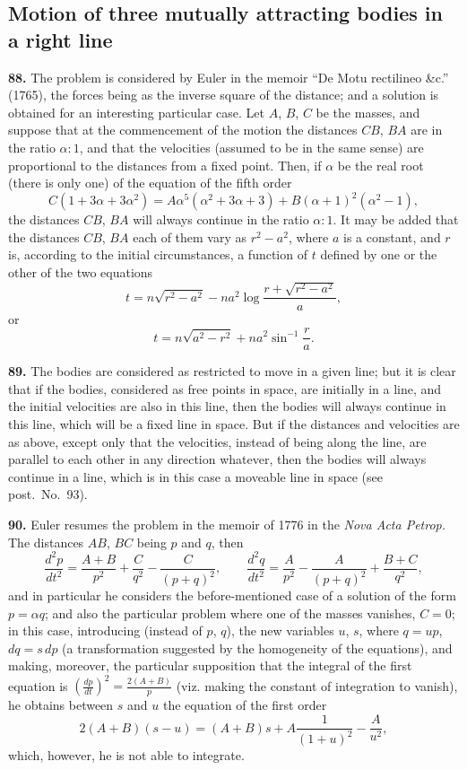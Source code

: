 \documentclass[11pt,a4paper]{book}
\begin{document}
\subsection*{Motion of three mutually attracting bodies in a right line}

\textbf{88.} The problem is considered by Euler in the memoir ``De Motu rectilineo \&c.'' (1765), the forces being as the inverse square of the distance; and a solution is obtained for an interesting particular case. Let $A$, $B$, $C$ be the masses, and suppose that at the commencement of the motion the distances $CB$, $BA$ are in the ratio $\alpha : 1$, and that the velocities (assumed to be in the same sense) are proportional to the distances from a fixed point. Then, if $\alpha$ be the real root (there is only one) of the equation of the fifth order
\[
C(1 + 3\alpha + 3\alpha^2) = A\alpha^5(\alpha^2 + 3\alpha + 3) + B(\alpha + 1)^2(\alpha^2 - 1),
\]
the distances $CB$, $BA$ will always continue in the ratio $\alpha : 1$. It may be added that the distances $CB$, $BA$ each of them vary as $r^2 - a^2$, where $a$ is a constant, and $r$ is, according to the initial circumstances, a function of $t$ defined by one or the other of the two equations
\[
t = n\sqrt{r^2 - a^2} - na^2\log\frac{r + \sqrt{r^2 - a^2}}{a},
\]
or
\[
t = n\sqrt{a^2 - r^2} + na^2\sin^{-1}\frac{r}{a}.
\]

\textbf{89.} The bodies are considered as restricted to move in a given line; but it is clear that if the bodies, considered as free points in space, are initially in a line, and the initial velocities are also in this line, then the bodies will always continue in this line, which will be a fixed line in space. But if the distances and velocities are as above, except only that the velocities, instead of being along the line, are parallel to each other in any direction whatever, then the bodies will always continue in a line, which is in this case a moveable line in space (see post.\ No.~93).

\textbf{90.} Euler resumes the problem in the memoir of 1776 in the \textit{Nova Acta Petrop.} The distances $AB$, $BC$ being $p$ and $q$, then
\[
\frac{d^2p}{dt^2} = \frac{A + B}{p^2} + \frac{C}{q^2} - \frac{C}{(p+q)^2}, \qquad
\frac{d^2q}{dt^2} = \frac{A}{p^2} - \frac{A}{(p+q)^2} + \frac{B + C}{q^2},
\]
and in particular he considers the before-mentioned case of a solution of the form $p = \alpha q$; and also the particular problem where one of the masses vanishes, $C = 0$; in this case, introducing (instead of $p$, $q$), the new variables $u$, $s$, where $q = up$, $dq = s\,dp$ (a transformation suggested by the homogeneity of the equations), and making, moreover, the particular supposition that the integral of the first equation is $\left(\frac{dp}{dt}\right)^2 = \frac{2(A+B)}{p}$ (viz. making the constant of integration to vanish), he obtains between $s$ and $u$ the equation of the first order
\[
2(A + B)(s - u) = (A + B)s + A\frac{1}{(1+u)^2} - \frac{A}{u^2},
\]
which, however, he is not able to integrate.
\end{document}
